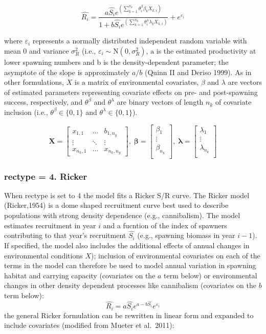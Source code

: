 \documentclass[
]{article}
\begin{document}
\[\hat{R_i}=\frac{ a \hat{S_i}e^{ \left( \sum_{k=1}^{n_k}{\theta_i^{\beta}\beta_k X_{k,i}} \right)}}{ 1+b\hat{S_i}e^{\left( \sum_{k=1}^{n_k}{\theta_i^{\lambda}\lambda_k X_{k,i}} \right) }}+e^{\varepsilon_i}\]

where \(\varepsilon_i\) represents a normally distributed independent
random variable with mean 0 and variance \(\sigma^2_R\) (i.e.,
\(\varepsilon_i\sim \mathrm N(0,\sigma^2_R)\), \(\mathrm a\) is the
estimated productivity at lower spawning numbers and b is the
density-dependent parameter; the asymptote of the slope is approximately
\(a/b\) (Quinn II and Deriso 1999). As in other formulations, \({X}\) is
a matrix of environmental covariates, \(\beta\) and \(\lambda\) are
vectors of estimated parameters representing covariate effects on pre-
and post-spawning success, respectively, and \(\theta^{\beta}\) and
\(\theta^{\lambda}\) are binary vectors of length \(n_k\) of covariate
inclusion (i.e., \({\theta^{\beta}} \in \{0,1 \}\) and
\({\theta^{\lambda}} \in \{0,1 \}\)).

\[\mathbf{X} = \left[\begin{array}
{rrr}
x_{1,1} & \dots  & b_{1,n_y} \\
\vdots & \ddots & \vdots \\
x_{n_k,1} & \dots  & x_{n_k,n_y}
\end{array}\right],\;
\mathbf{\beta} = \left[\begin{array}
{rrr}
\beta_1 \\
\vdots  \\
\beta_{n_k} \\
\end{array}\right],\;
\mathbf{\lambda} = \left[\begin{array}
{rrr}
\lambda_1 \\
\vdots  \\
\lambda_{n_k}\\
\end{array}\right]
\]

\hypertarget{rectype-4.-ricker}{%
\subsubsection{rectype = 4. Ricker}\label{rectype-4.-ricker}}

When rectype is set to 4 the model fits a Ricker S/R curve. The Ricker
model (Ricker,1954) is a dome shaped recruitment curve best used to
describe populations with strong density dependence (e.g., cannibalism).
The model estimates recruitment in year \(i\) and a fucntion of the
index of spawners contributing to that year's recruitment \(\hat{S_i}\)
(e.g., spawning biomass in year \(i-1\)). If specified, the model also
includes the additional effects of annual changes in environmental
conditions \({X}\)); inclusion of environmental covariates on each of
the terms in the model can therefore be used to model annual variation
in spawning habitat and carrying capacity (covariates on the \(a\) term
below) or environmental changes in other density dependent processes
like cannibalism (covariates on the \(b\) term below):
\[\hat{R_i}= a\hat{S_i}e^{a-b\hat{S_i}} e^{\varepsilon_i} \] the general
Ricker formulation can be rewritten in linear form and expanded to
include covariates (modified from Mueter et al.~2011):
\end{document}

